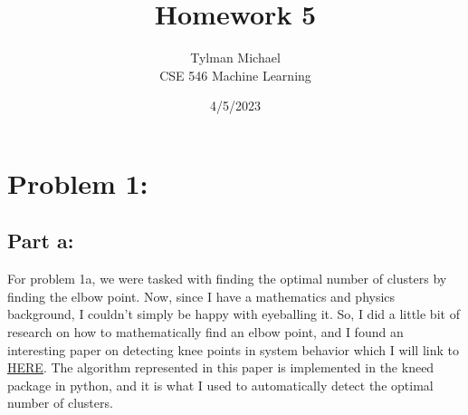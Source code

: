 \documentclass[12pt]{article}
\title{Homework 5}
\author{Tylman Michael\\CSE 546 Machine Learning}
\date{4/5/2023}
\begin{document}
\maketitle{}
\section{Problem 1:}
\subsection{Part a:}
For problem 1a, we were tasked with finding the optimal number of clusters by finding the elbow point. Now, since I have 
a mathematics and physics background, I couldn't simply be happy with eyeballing it. So, I did a little bit of research
on how to mathematically find an elbow point, and I found an interesting paper on detecting knee points in system behavior
which I will link to \href{https://raghavan.usc.edu//papers/kneedle-simplex11.pdf}{HERE}. The algorithm represented 
in this paper is implemented in the kneed package in python, and it is what I used to automatically detect the optimal 
number of clusters.
\end{document}
